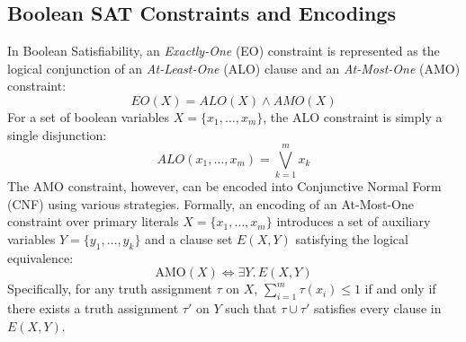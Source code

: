 \subsection{Boolean SAT Constraints and Encodings}
In Boolean Satisfiability, an \textit{Exactly-One} (EO) constraint is represented as the logical conjunction of an \textit{At-Least-One} (ALO) clause and an \textit{At-Most-One} (AMO) constraint:
\begin{equation}
EO(X) = ALO(X) \land AMO(X)
\end{equation}
For a set of boolean variables $X = \{x_1, \ldots, x_m\}$, the ALO constraint is simply a single disjunction:
\begin{equation}
ALO(x_1,\ldots,x_m)=\bigvee_{k=1}^{m}x_k
\end{equation}
The AMO constraint, however, can be encoded into Conjunctive Normal Form (CNF) using various strategies. Formally, an encoding of an At-Most-One constraint over primary literals $X = \{x_1, \ldots, x_m\}$ introduces a set of auxiliary variables $Y = \{y_1, \dots, y_k\}$ and a clause set $E(X, Y)$ satisfying the logical equivalence:
\begin{equation}
\text{AMO}(X) \iff \exists Y.\, E(X, Y)
\end{equation}
Specifically, for any truth assignment $\tau$ on $X$, $\sum_{i=1}^m \tau(x_i) \le 1$ if and only if there exists a truth assignment $\tau'$ on $Y$ such that $\tau \cup \tau'$ satisfies every clause in $E(X, Y)$.

